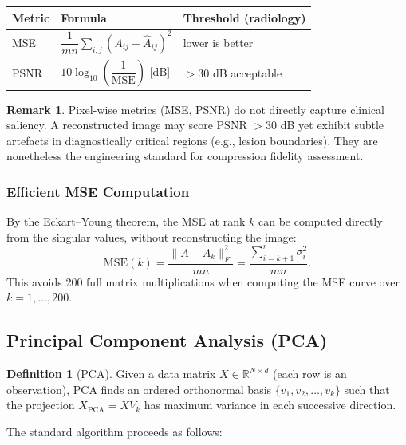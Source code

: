 \documentclass[11pt,a4paper]{article}
\theoremstyle{definition}
\newtheorem{definition}{Definition}
\newtheorem{remark}{Remark}
\begin{document}
\begin{center}
\begin{tabularx}{0.88\textwidth}{lXl}
\toprule
\textbf{Metric} & \textbf{Formula} & \textbf{Threshold (radiology)}\\
\midrule
MSE  & $\dfrac{1}{mn}\displaystyle\sum_{i,j}(A_{ij}-\hat A_{ij})^2$ & lower is better \\[8pt]
PSNR & $10\log_{10}\!\left(\dfrac{1}{\text{MSE}}\right)$ [dB]       & $>30$ dB acceptable \\
\bottomrule
\end{tabularx}
\end{center}

\begin{remark}
  Pixel-wise metrics (MSE, PSNR) do not directly capture clinical saliency.
  A reconstructed image may score PSNR $>30$ dB yet exhibit subtle artefacts
  in diagnostically critical regions (e.g., lesion boundaries). They are
  nonetheless the engineering standard for compression fidelity assessment.
\end{remark}

\subsubsection{Efficient MSE Computation}

By the Eckart--Young theorem, the MSE at rank $k$ can be computed directly from
the singular values, without reconstructing the image:
\[
  \mathrm{MSE}(k)
    = \frac{\|A - A_k\|_F^2}{mn}
    = \frac{\displaystyle\sum_{i=k+1}^{r}\sigma_i^2}{mn}.
\]
This avoids 200 full matrix multiplications when computing the MSE curve over
$k = 1, \ldots, 200$.

\subsection{Principal Component Analysis (PCA)}

\begin{definition}[PCA]
  Given a data matrix $X \in \mathbb{R}^{N \times d}$ (each row is an
  observation), PCA finds an ordered orthonormal basis
  $\{v_1, v_2, \ldots, v_k\}$ such that the projection
  $X_{\text{PCA}} = X V_k$ has maximum variance in each successive direction.
\end{definition}

\noindent The standard algorithm proceeds as follows:
\end{document}
